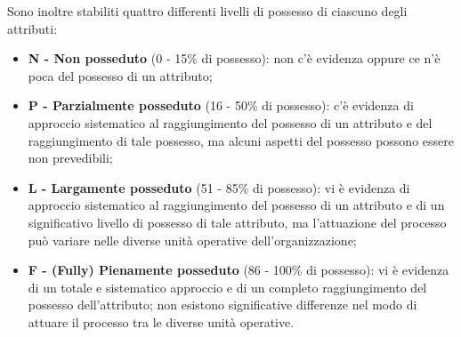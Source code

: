 Sono inoltre stabiliti quattro differenti livelli di possesso di ciascuno degli attributi:\\
\begin{itemize}
\item \textbf{N - Non posseduto} (0 - 15\% di possesso): non c’è evidenza oppure ce n’è poca del possesso di un attributo;
\item \textbf{P - Parzialmente posseduto} (16 - 50\% di possesso): c’è evidenza di approccio sistematico al raggiungimento del possesso di un attributo e del raggiungimento di tale possesso, ma alcuni aspetti del possesso possono essere non prevedibili;
\item \textbf{L - Largamente posseduto} (51 - 85\% di possesso): vi è evidenza di approccio sistematico al raggiungimento del possesso di un attributo e di un significativo livello di possesso di tale attributo, ma l’attuazione del processo può variare nelle diverse unità operative dell'organizzazione;
\item \textbf{F - (Fully) Pienamente posseduto} (86 - 100\% di possesso): vi è evidenza di un totale e sistematico approccio e di un completo raggiungimento del possesso dell’attributo; non esistono significative differenze nel modo di attuare il processo tra le diverse unità operative.
\end{itemize}

